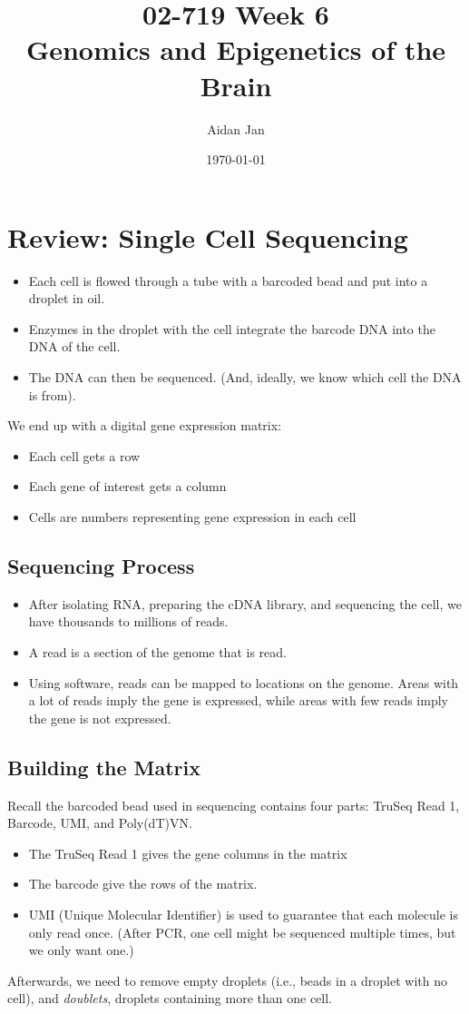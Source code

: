 \documentclass[10pt]{article}
\title{02-719 Week 6 \\ \large{Genomics and Epigenetics of the Brain}}
\author{Aidan Jan}
\date{\today}
\begin{document}
\maketitle

\section*{Review: Single Cell Sequencing}
\begin{itemize}
	\item Each cell is flowed through a tube with a barcoded bead and put into a droplet in oil.  
	\item Enzymes in the droplet with the cell integrate the barcode DNA into the DNA of the cell.
	\item The DNA can then be sequenced.  (And, ideally, we know which cell the DNA is from).
\end{itemize}
We end up with a digital gene expression matrix:
\begin{itemize}
	\item Each cell gets a row
	\item Each gene of interest gets a column
	\item Cells are numbers representing gene expression in each cell
\end{itemize}

\subsection*{Sequencing Process}
\begin{itemize}
	\item After isolating RNA, preparing the cDNA library, and sequencing the cell, we have thousands to millions of reads.
	\item A read is a section of the genome that is read.
	\item Using software, reads can be mapped to locations on the genome.  Areas with a lot of reads imply the gene is expressed, while areas with few reads imply the gene is not expressed.
\end{itemize}

\subsection*{Building the Matrix}
Recall the barcoded bead used in sequencing contains four parts: TruSeq Read 1, Barcode, UMI, and Poly(dT)VN.  
\begin{itemize}
	\item The TruSeq Read 1 gives the gene columns in the matrix
	\item The barcode give the rows of the matrix.
	\item UMI (Unique Molecular Identifier) is used to guarantee that each molecule is only read once.  (After PCR, one cell might be sequenced multiple times, but we only want one.)
\end{itemize}
Afterwards, we need to remove empty droplets (i.e., beads in a droplet with no cell), and \textit{doublets}, droplets containing more than one cell.
\end{document}

